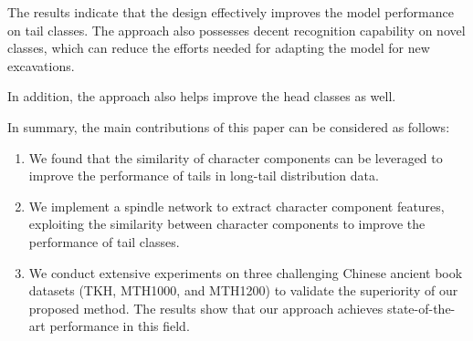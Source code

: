 The results indicate that the design effectively improves the model performance on tail classes. The approach also possesses decent recognition capability on novel classes, which can reduce the efforts needed for adapting the model for new excavations.
 
In addition, the approach also helps improve the head classes as well. 

In summary, the main contributions of this paper can be considered as follows:
\begin{enumerate}[noitemsep]
    \item We found that the similarity of character components can be leveraged to improve the performance of tails in long-tail distribution data.
    \item We implement a spindle network to extract character component features, exploiting the similarity between character components to improve the performance of tail classes.
    \item We conduct extensive experiments on three challenging Chinese ancient book datasets (TKH, MTH1000, and MTH1200) to validate the superiority of our proposed method. The results show that our approach achieves state-of-the-art performance in this field.
\end{enumerate}






